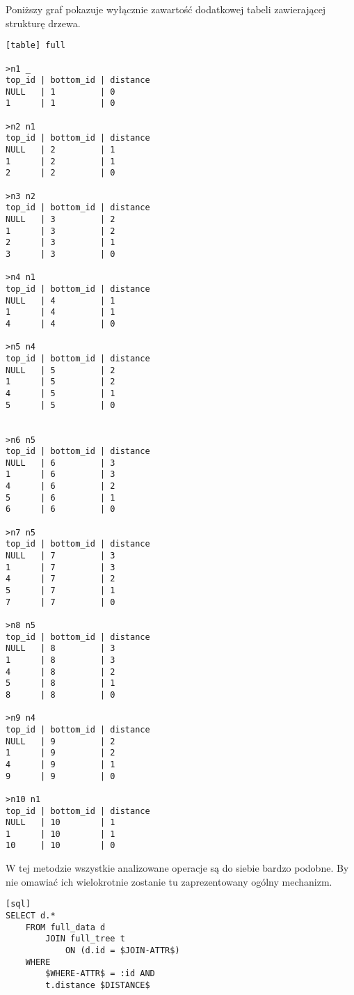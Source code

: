 Poniższy graf pokazuje wyłącznie zawartość dodatkowej tabeli zawierającej strukturę drzewa.


\begin{verbatim}[table] full

>n1 _
top_id | bottom_id | distance
NULL   | 1         | 0
1      | 1         | 0

>n2 n1
top_id | bottom_id | distance
NULL   | 2         | 1
1      | 2         | 1
2      | 2         | 0

>n3 n2
top_id | bottom_id | distance
NULL   | 3         | 2
1      | 3         | 2
2      | 3         | 1
3      | 3         | 0

>n4 n1
top_id | bottom_id | distance
NULL   | 4         | 1
1      | 4         | 1
4      | 4         | 0

>n5 n4
top_id | bottom_id | distance
NULL   | 5         | 2
1      | 5         | 2
4      | 5         | 1
5      | 5         | 0


>n6 n5
top_id | bottom_id | distance
NULL   | 6         | 3
1      | 6         | 3
4      | 6         | 2
5      | 6         | 1
6      | 6         | 0

>n7 n5
top_id | bottom_id | distance
NULL   | 7         | 3
1      | 7         | 3
4      | 7         | 2
5      | 7         | 1
7      | 7         | 0

>n8 n5
top_id | bottom_id | distance
NULL   | 8         | 3
1      | 8         | 3
4      | 8         | 2
5      | 8         | 1
8      | 8         | 0

>n9 n4
top_id | bottom_id | distance
NULL   | 9         | 2
1      | 9         | 2
4      | 9         | 1
9      | 9         | 0

>n10 n1
top_id | bottom_id | distance
NULL   | 10        | 1
1      | 10        | 1
10     | 10        | 0

\end{verbatim}






W tej metodzie wszystkie analizowane operacje są do siebie bardzo podobne.
By nie omawiać ich wielokrotnie zostanie tu zaprezentowany ogólny mechanizm.

\begin{verbatim}[sql]
SELECT d.*
    FROM full_data d 
        JOIN full_tree t 
            ON (d.id = $JOIN-ATTR$)
    WHERE
        $WHERE-ATTR$ = :id AND
        t.distance $DISTANCE$
\end{verbatim}


